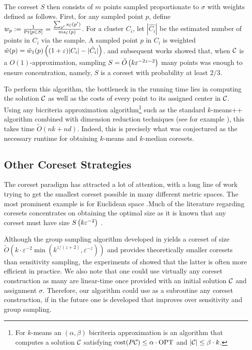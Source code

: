 The coreset $S$ then consists of $m$ points sampled proportionate to $\sigma$ with weights defined as follows. First, for any sampled point $p$, define $w_p :=
\frac{1}{\Pr[p \in S]} = \frac{\sum_{p'} s_\mathcal C(p')}{m s_\mathcal C(p)}$. For a cluster $C_i$, let $|\hat{C_i}|$ be the estimated number of points in $C_i$ via the
sample. A sampled point $p$ in $C_i$ is weighted $\tilde w(p) = \tilde w_1(p) \left( (1+\varepsilon)|C_i|
- |\hat{C_i}|\right)$.  \cite{FeldmanL11} and subsequent works showed that, when $\mathcal C$ is a $O(1)$-approximation, sampling $S = \tilde O\left(
k \varepsilon^{-2z-2}\right)$ many points was enough to ensure concentration, namely, $S$ is a coreset with probability at least $2/3$.

To perform this algorithm, the bottleneck in the running time lies in computing the solution $\mathcal C$ as well as the costs of every point to its assigned
center in $\mathcal C$. Using any bicriteria approximation algorithm\footnote{For $k$-means an $(\alpha,\beta)$ bicriteria approximation is an algorithm that
computes a solution $\mathcal C$ satisfying $\operatorname{cost}(P\mathcal C)\leq \alpha\cdot \text{OPT}$ and $|\mathcal C|\leq \beta\cdot k$.} such as the standard $k$-means++ algorithm
\cite{ArV07} combined with dimension reduction techniques (see for example \cite{BecchettiBC0S19,CohenEMMP15,MakarychevMR19}), this takes time $\tilde O(nk
+nd)$. Indeed, this is precisely what was conjectured as the necessary runtime for obtaining $k$-means and $k$-median coresets.

\subsection{Other Coreset Strategies}
\label{ssec:clustering_prelim}

The coreset paradigm has attracted a lot of attention, with a long line of work trying to get the smallest coreset possible in many different metric spaces. The
most prominent example is for Euclidean space \cite{BadoiuHI02, HaM04, Chen09, HuangV20, stoc22}.Much of the literature regarding coresets concentrates on obtaining the optimal size as it is known
that any coreset must have size $S \left( k\varepsilon^{-2}\right)$ \cite{stoc22}. 

Although the group sampling algorithm developed in \cite{stoc21, stoc22} yields a coreset of size $\tilde{O}(k\cdot \varepsilon^{-2}
\min(k^{z/(z+2)},\varepsilon^{-z}))$ \cite{CLSSS22} and provides theoretically smaller coresets than sensitivity sampling, the experiments of \cite{chrisESA}
showed that the latter is often more efficient in practice. We also note that one could use virtually any coreset construction as many are linear-time once
provided with an initial solution $\mathcal C$ and assignment $\sigma$.  Therefore, our algorithm could use as a subroutine any coreset construction, if in the
future one is developed that improves over sensitivity and group sampling.

